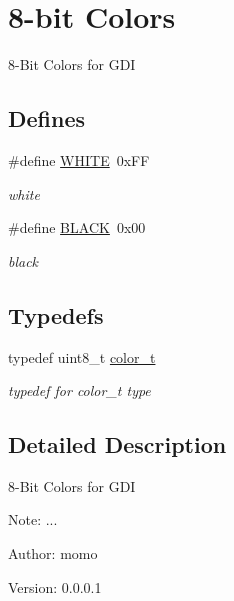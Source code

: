 \hypertarget{group__hgdi__colors8}{
\section{8-bit Colors}
\label{group__hgdi__colors8}
}
8-Bit Colors for GDI  


\subsection*{Defines}
\begin{CompactItemize}
\item 
\hypertarget{group__hgdi__colors8_g87b537f5fa5c109d3c05c13d6b18f382}{
\#define \hyperlink{group__hgdi__colors8_g87b537f5fa5c109d3c05c13d6b18f382}{WHITE}~0xFF}
\label{group__hgdi__colors8_g87b537f5fa5c109d3c05c13d6b18f382}

\begin{CompactList}\small\item\em white \item\end{CompactList}\item 
\hypertarget{group__hgdi__colors8_g7b3b25cba33b07c303f3060fe41887f6}{
\#define \hyperlink{group__hgdi__colors8_g7b3b25cba33b07c303f3060fe41887f6}{BLACK}~0x00}
\label{group__hgdi__colors8_g7b3b25cba33b07c303f3060fe41887f6}

\begin{CompactList}\small\item\em black \item\end{CompactList}\end{CompactItemize}
\subsection*{Typedefs}
\begin{CompactItemize}
\item 
\hypertarget{group__hgdi__colors8_g2d1e492285f42b7772298f092243fe6b}{
typedef uint8\_\-t \hyperlink{group__hgdi__colors8_g2d1e492285f42b7772298f092243fe6b}{color\_\-t}}
\label{group__hgdi__colors8_g2d1e492285f42b7772298f092243fe6b}

\begin{CompactList}\small\item\em typedef for color\_\-t type \item\end{CompactList}\end{CompactItemize}


\subsection{Detailed Description}
8-Bit Colors for GDI 

\begin{Desc}
\item[Note:]... \end{Desc}
\begin{Desc}
\item[Author:]momo \end{Desc}
\begin{Desc}
\item[Version:]0.0.0.1 \end{Desc}
